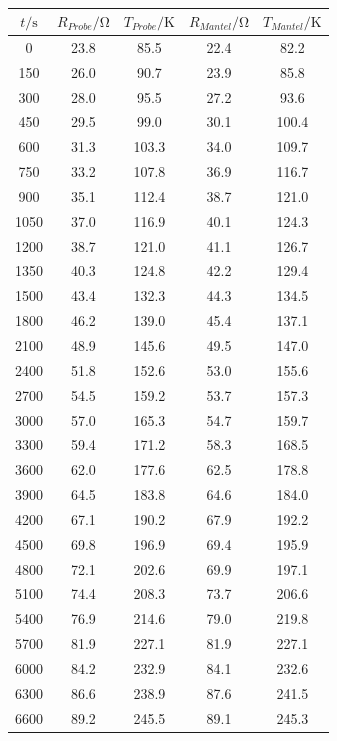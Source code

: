 \begin{table}  %
  \centering
  \caption{}
  \label{tab:Messwerte}
  \begin{tabular}{c c c c c}
  \toprule
  $t/\si{\second}$ & $R_{Probe}/\si{\ohm}$ & $T_{Probe}/\si{\kelvin}$ & $R_{Mantel}/\si{\ohm}$ & $T_{Mantel}/\si{\kelvin}$\\
  \midrule
  0	&	23.8	&	85.5	&	22.4	&	82.2   \\
  150	&	26.0	&	90.7	&	23.9	&	85.8   \\
  300	&	28.0	&	95.5	&	27.2	&	93.6   \\
  450	&	29.5	&	99.0	&	30.1	&	100.4   \\
  600	&	31.3	&	103.3	&	34.0	&	109.7   \\
  750	&	33.2	&	107.8	&	36.9	&	116.7   \\
  900	&	35.1	&	112.4	&	38.7	&	121.0   \\
  1050	&	37.0	&	116.9	&	40.1	&	124.3   \\
  1200	&	38.7	&	121.0	&	41.1	&	126.7   \\
  1350	&	40.3	&	124.8	&	42.2	&	129.4   \\
  1500	&	43.4	&	132.3	&	44.3	&	134.5   \\
  1800	&	46.2	&	139.0	&	45.4	&	137.1   \\
  2100	&	48.9	&	145.6	&	49.5	&	147.0   \\
  2400	&	51.8	&	152.6	&	53.0	&	155.6   \\
  2700	&	54.5	&	159.2	&	53.7	&	157.3   \\
  3000	&	57.0	&	165.3	&	54.7	&	159.7   \\
  3300	&	59.4	&	171.2	&	58.3	&	168.5   \\
  3600	&	62.0	&	177.6	&	62.5	&	178.8   \\
  3900	&	64.5	&	183.8	&	64.6	&	184.0   \\
  4200	&	67.1	&	190.2	&	67.9	&	192.2   \\
  4500	&	69.8	&	196.9	&	69.4	&	195.9   \\
  4800	&	72.1	&	202.6	&	69.9	&	197.1   \\
  5100	&	74.4	&	208.3	&	73.7	&	206.6   \\
  5400	&	76.9	&	214.6	&	79.0	&	219.8   \\
  5700	&	81.9	&	227.1	&	81.9	&	227.1   \\
  6000	&	84.2	&	232.9	&	84.1	&	232.6   \\
  6300	&	86.6	&	238.9	&	87.6	&	241.5   \\
  6600	&	89.2	&	245.5	&	89.1	&	245.3   \\

\end{tabular}
\end{table}
